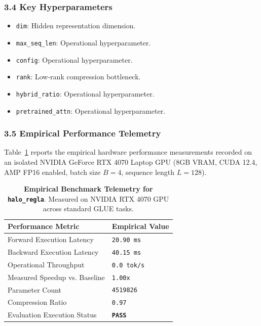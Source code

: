 \subsubsection*{3.4 Key Hyperparameters}
\begin{itemize}
    \item \texttt{dim}: Hidden representation dimension.
    \item \texttt{max\_seq\_len}: Operational hyperparameter.
    \item \texttt{config}: Operational hyperparameter.
    \item \texttt{rank}: Low-rank compression bottleneck.
    \item \texttt{hybrid\_ratio}: Operational hyperparameter.
    \item \texttt{pretrained\_attn}: Operational hyperparameter.
\end{itemize}

\subsubsection*{3.5 Empirical Performance Telemetry}
Table~\ref{tab:telemetry_halo_regla} reports the empirical hardware performance measurements recorded on an isolated NVIDIA GeForce RTX 4070 Laptop GPU (8GB VRAM, CUDA 12.4, AMP FP16 enabled, batch size $B=4$, sequence length $L=128$).

\begin{table}[h]
\centering
\small
\caption{\textbf{Empirical Benchmark Telemetry for \texttt{halo\_regla}}. Measured on NVIDIA RTX 4070 GPU across standard GLUE tasks.}
\label{tab:telemetry_halo_regla}
\begin{tabularx}{\columnwidth}{lX}
\toprule
\textbf{Performance Metric} & \textbf{Empirical Value} \\
\midrule
Forward Execution Latency & \texttt{20.90 ms} \\
Backward Execution Latency & \texttt{40.15 ms} \\
Operational Throughput & \texttt{0.0 tok/s} \\
Measured Speedup vs. Baseline & \texttt{1.00x} \\
Parameter Count & \texttt{4519826} \\
Compression Ratio & \texttt{0.97} \\
Evaluation Execution Status & \textbf{\texttt{PASS}} \\
\bottomrule
\end{tabularx}
\end{table}

